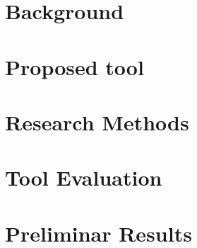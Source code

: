
\en

\chapter{Background}
\label{cha:back}


\par

\par

\par

\par
\chapter{Proposed tool}
\label{cha:tool}


\par

\par

\par

\chapter{Research Methods}
\label{cha:method}


\par

\chapter{Tool Evaluation}
\label{cha:eval}


\par

\chapter{Preliminar Results}
\label{cha:results}




